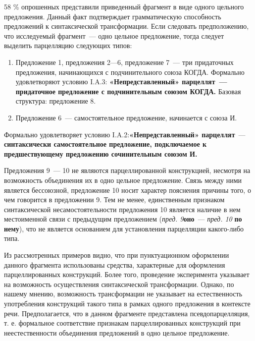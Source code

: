 \documentclass{kursa4}
\begin{document}
{      58 \% опрошенных представили приведенный фрагмент в виде одного цельного предложения. Данный факт подтверждает грамматическую способность предложений к синтаксической трансформации. Если следовать предположению, что исследуемый фрагмент~--- одно цельное предложение, тогда следует выделить парцелляцию следующих типов: 

      \begin{enumerate}
        \item Предложение 1, предложения 2—6, предложение 7~--- три придаточных предложения, начинающихся с подчинительного союза КОГДА. \newline
        Формально удовлетворяют условию I.A.3: \textbf{«Непредставленный» парцеллят~--- придаточное предложение с подчинительным союзом КОГДА.} Базовая структура: предложение 8. \item Предложение 6~--- самостоятельное предложение, начинается с союза И. \end{enumerate}

      Формально удовлетворяет условию I.A.2:\textbf{«Непредставленный» парцеллят}~--- \textbf{синтаксически самостоятельное предложение, подключаемое к предшествующему предложению сочинительным союзом И.}

      Предложения 9~--- 10 не являются парцеллированной конструкцией, несмотря на возможность объединения их в одно цельное предложение. Связь между ними является бессоюзной, предложение 10 носит характер пояснения причины того, о чем говорится в предложении 9. Тем не менее, единственным признаком синтаксической несамостоятельности предложения 10 является наличие в нем местоименной связи с предыдущим предложением (\textit{пред. 9}\textbf{оно}~--- \textit{пред. 10}{
      }\textbf{{по нему}}{), что не является основанием для установления парцелляции какого-либо типа.}

      {}{Из рассмотренных примеров видно, что при пунктуационном оформлении данного фрагмента использованы средства, характерные для оформления парцеллированных конструкций. Более того, проведение эксперимента указывает на возможность осуществления синтаксической трансформации. Однако, по нашему мнению, возможность трансформации не указывает на естественность употребления конструкций такого типа в рамках одного предложения в контексте речи.
      }{Предполагается, что в данном фрагменте представлена псевдопарцелляция, т. е. формальное соответствие признакам парцеллированных конструкций при неестественности объединения предложений в одно цельное предложение. }

}
\end{document}
